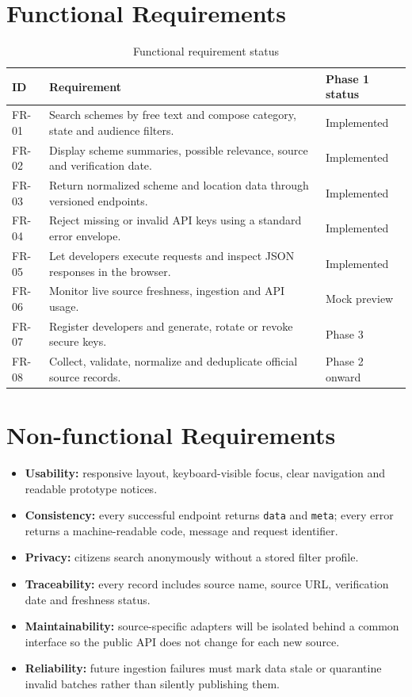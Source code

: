 \documentclass{tietreport}
\begin{document}
\section{Functional Requirements}
\begin{table}[H]
\centering
\begin{tabularx}{\textwidth}{@{}p{1.2cm}X p{2.6cm}@{}}
\toprule
\textbf{ID} & \textbf{Requirement} & \textbf{Phase 1 status} \\
\midrule
FR-01 & Search schemes by free text and compose category, state and audience filters. & Implemented \\
FR-02 & Display scheme summaries, possible relevance, source and verification date. & Implemented \\
FR-03 & Return normalized scheme and location data through versioned endpoints. & Implemented \\
FR-04 & Reject missing or invalid API keys using a standard error envelope. & Implemented \\
FR-05 & Let developers execute requests and inspect JSON responses in the browser. & Implemented \\
FR-06 & Monitor live source freshness, ingestion and API usage. & Mock preview \\
FR-07 & Register developers and generate, rotate or revoke secure keys. & Phase 3 \\
FR-08 & Collect, validate, normalize and deduplicate official source records. & Phase 2 onward \\
\bottomrule
\end{tabularx}
\caption{Functional requirement status}
\label{tab:functional}
\end{table}

\section{Non-functional Requirements}
\begin{itemize}
  \item \textbf{Usability:} responsive layout, keyboard-visible focus, clear navigation and
        readable prototype notices.
  \item \textbf{Consistency:} every successful endpoint returns \texttt{data} and \texttt{meta};
        every error returns a machine-readable code, message and request identifier.
  \item \textbf{Privacy:} citizens search anonymously without a stored filter profile.
  \item \textbf{Traceability:} every record includes source name, source URL, verification date
        and freshness status.
  \item \textbf{Maintainability:} source-specific adapters will be isolated behind a common
        interface so the public API does not change for each new source.
  \item \textbf{Reliability:} future ingestion failures must mark data stale or quarantine invalid
        batches rather than silently publishing them.
\end{itemize}
\end{document}
